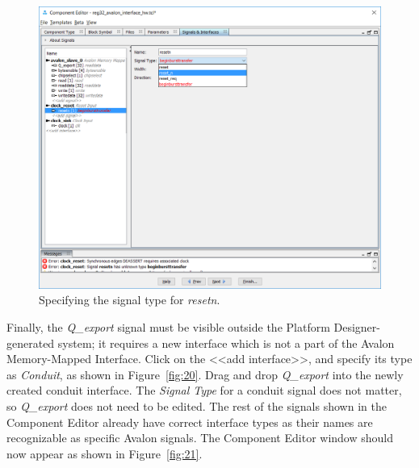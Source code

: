 \documentclass[11pt, twoside, pdftex]{article}
\begin{document}
\clearpage

\begin{figure}[H]
   \begin{center}
        \includegraphics[scale=0.6]{figures/figure19.png}
   \end{center}
   \caption{Specifying the signal type for {\it resetn}.}
	\label{fig:19}
\end{figure}

\clearpage
\newpage
Finally, the {\it Q\_export} signal must be visible outside the 
Platform Designer-generated system; it requires a new interface which is not a part of the 
Avalon Memory-Mapped Interface.  Click on the {\sf <{}<add interface>{}>}, and specify its type as {\it Conduit}, as shown in Figure~\ref{fig:20}.
Drag and drop {\it Q\_export} into the newly created conduit interface. The {\it Signal Type} for a conduit signal does not matter, so {\it Q\_export} does not need to be edited. The rest of the signals shown in the Component Editor already have correct interface
types as their names are recognizable as specific Avalon signals.
The Component Editor window should now appear as shown in Figure~\ref{fig:21}.
\end{document}
